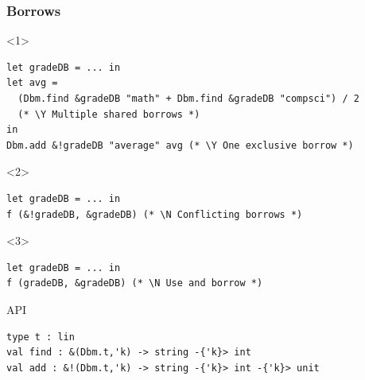 \documentclass[aspectratio=169,dvipsnames,svgnames,10pt]{beamer}
\newcommand\Y{{\color{Green}{\ding{52}}}}
\newcommand\N{{\color{Red}{\ding{56}}}}
\begin{document}
\begin{frame}[fragile]
  \frametitle{Borrows}
  \begin{onlyenv}<1>
\begin{verbatim}
let gradeDB = ... in
let avg =
  (Dbm.find &gradeDB "math" + Dbm.find &gradeDB "compsci") / 2
  (* \Y Multiple shared borrows *)
in
Dbm.add &!gradeDB "average" avg (* \Y One exclusive borrow *)
\end{verbatim}
\end{onlyenv}


\begin{onlyenv}<2>
\begin{verbatim}
let gradeDB = ... in
f (&!gradeDB, &gradeDB) (* \N Conflicting borrows *)
\end{verbatim}
\end{onlyenv}
\begin{onlyenv}<3>
\begin{verbatim}
let gradeDB = ... in
f (gradeDB, &gradeDB) (* \N Use and borrow *)
\end{verbatim}
\end{onlyenv}
\end{frame}

\begin{frame}[fragile]{API}

\begin{verbatim}
type t : lin
val find : &(Dbm.t,'k) -> string -{'k}> int
val add : &!(Dbm.t,'k) -> string -{'k}> int -{'k}> unit
\end{verbatim}
  
\end{frame}
\end{document}
